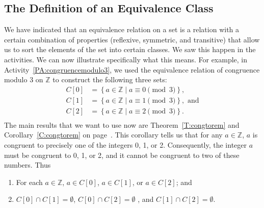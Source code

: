 \subsection*{The Definition of an Equivalence Class}
We have indicated that an equivalence relation on a set is a relation with a certain combination of properties (reflexive, symmetric, and transitive) that allow us to sort the elements of the set into certain classes.  We saw this happen in the \typel activities.  We can now illustrate specifically what this means.  For example, in \typeu  Activity~\ref*{PA:congruencemodulo3}, we used the equivalence relation of congruence modulo 3 on  $\mathbb{Z}$ to construct the following three sets:
\[
\begin{aligned}
  C[ 0 ] &= \left\{ { {a \in \mathbb{Z} } \mid a \equiv 0 \pmod 3} \right\}\!, \\ 
  C[ 1 ] &= \left\{ { {a \in \mathbb{Z} } \mid a \equiv 1 \pmod 3} \right\}\!,\text{ and} \\ 
  C[ 2 ] &= \left\{ { {a \in \mathbb{Z} } \mid a \equiv 2 \pmod 3} \right\}\!. \\ 
\end{aligned}
\]
The main results that we want to use now are Theorem~\ref{T:congtorem} and Corollary~\ref{C:congtorem} on page~\pageref{T:congtorem}.  This corollary tells us that for any  $a \in \mathbb{Z}$,  $a$  is congruent to precisely one of the integers 0, 1, or 2.   Consequently, the integer  $a$  must be congruent to 0, 1, or  2, and it cannot be congruent to two of these numbers. Thus

\begin{enumerate}
\item For each  $a \in \mathbb{Z}$,  $a \in C[ 0 ]$, $a \in C[ 1 ]$, or
$a \in C[ 2 ]$; and

\item $C[ 0 ] \cap C[ 1 ] = \emptyset$, 
$C[ 0 ] \cap C[ 2 ] = \emptyset$ , and 
$C[ 1 ] \cap C[ 2 ] = \emptyset $.
\end{enumerate}

